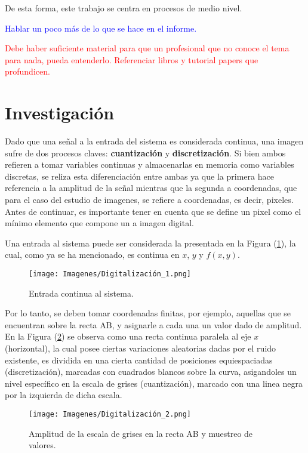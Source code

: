 	De esta forma, este trabajo se centra en procesos de medio nivel.
	
	\textcolor{blue}{Hablar un poco más de lo que se hace en el informe.}
	
	
	\textcolor{red}{Debe haber suficiente material para que un profesional que no conoce el tema para nada, pueda entenderlo. Referenciar libros y tutorial papers que profundicen.}
	
\section{Investigación}
Dado que una señal a la entrada del sistema es considerada continua, una imagen sufre de dos procesos claves: \textbf{cuantización} y \textbf{discretización}. Si bien ambos refieren a tomar variables continuas y almacenarlas en memoria como variables discretas, se reliza esta diferenciación entre ambas ya que la primera hace referencia a la amplitud de la señal mientras que la segunda a coordenadas, que para el caso del estudio de imagenes, se refiere a coordenadas, es decir, pixeles. Antes de continuar, es importante tener en cuenta que se define un pixel como el mínimo elemento que compone un a imagen digital.
	
Una entrada al sistema puede ser considerada la presentada en la Figura (\ref{fig:disc1}), la cual, como ya se ha mencionado, es continua en $x$, $y$ y $f(x,y)$.
\begin{figure}[H]
\centering
	\texttt{[image: Imagenes/Digitalización\_1.png]}
	\caption{Entrada continua al sistema.}
	\label{fig:disc1}
\end{figure}

Por lo tanto, se deben tomar coordenadas finitas, por ejemplo, aquellas que se encuentran sobre la recta AB, y asignarle a cada una un valor dado de amplitud. En la Figura (\ref{fig:disc2}) se observa como una recta continua paralela al eje $x$ (horizontal), la cual posee ciertas variaciones aleatorias dadas por el ruido existente, es dividida en una cierta cantidad de posiciones equiespaciadas (discretización), marcadas con cuadrados blancos sobre la curva, asigandoles un nivel específico en la escala de grises (cuantización), marcado con una linea negra por la izquierda de dicha escala.
\begin{figure}[H]
\centering
	\texttt{[image: Imagenes/Digitalización\_2.png]}
	\caption{Amplitud de la escala de grises en la recta AB y muestreo de valores.}
	\label{fig:disc2}
\end{figure}

